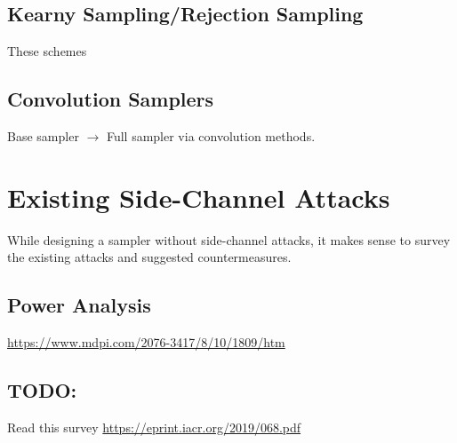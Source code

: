 \documentclass{article}
\begin{document}
\subsection{Kearny Sampling/Rejection Sampling}
These schemes 
\subsection{Convolution Samplers}
Base sampler $\to$ Full sampler via convolution methods.

\section{Existing Side-Channel Attacks}
While designing a sampler without side-channel attacks, it makes sense to survey the existing attacks and suggested countermeasures.
\subsection{Power Analysis}
\url{https://www.mdpi.com/2076-3417/8/10/1809/htm}

\subsection{TODO:}
Read this survey \url{https://eprint.iacr.org/2019/068.pdf}
\end{document}
